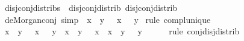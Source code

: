 \begin{isabellebody}
\endisatagproof
{\isafoldproof}%
%
\isadelimproof
\isanewline
%
\endisadelimproof
\isanewline
{}\isamarkupfalse%
\ disj{\isacharunderscore}{\kern0pt}conj{\isacharunderscore}{\kern0pt}distribs\ {\isacharequal}{\kern0pt}\ disj{\isacharunderscore}{\kern0pt}conj{\isacharunderscore}{\kern0pt}distrib\ disj{\isacharunderscore}{\kern0pt}conj{\isacharunderscore}{\kern0pt}distrib{}\isanewline
\isanewline
{}\isamarkupfalse%
%
\isadelimdocument
%
\endisadelimdocument
%
\isatagdocument
%
\isamarkuptrue%
%
\endisatagdocument
{\isafolddocument}%
%
\isadelimdocument
%
\endisadelimdocument
{}\isamarkupfalse%
\ de{\isacharunderscore}{\kern0pt}Morgan{\isacharunderscore}{\kern0pt}conj\ {\isacharbrackleft}{\kern0pt}simp{\isacharbrackright}{\kern0pt}{\isacharcolon}{\kern0pt}\ {\isachardoublequoteopen}\isactrlbold {\isacharminus}{\kern0pt}\ {\isacharparenleft}{\kern0pt}x\ \isactrlbold {\isasymsqinter}\ y{\isacharparenright}{\kern0pt}\ {\isacharequal}{\kern0pt}\ \isactrlbold {\isacharminus}{\kern0pt}\ x\ \isactrlbold {\isasymsqunion}\ \isactrlbold {\isacharminus}{\kern0pt}\ y{\isachardoublequoteclose}\isanewline
%
\isadelimproof
%
\endisadelimproof
%
\isatagproof
{}\isamarkupfalse%
\ {\isacharparenleft}{\kern0pt}rule\ compl{\isacharunderscore}{\kern0pt}unique{\isacharparenright}{\kern0pt}\isanewline
\ \ \isamarkupfalse%
\ {\isachardoublequoteopen}{\isacharparenleft}{\kern0pt}x\ \isactrlbold {\isasymsqinter}\ y{\isacharparenright}{\kern0pt}\ \isactrlbold {\isasymsqinter}\ {\isacharparenleft}{\kern0pt}\isactrlbold {\isacharminus}{\kern0pt}\ x\ \isactrlbold {\isasymsqunion}\ \isactrlbold {\isacharminus}{\kern0pt}\ y{\isacharparenright}{\kern0pt}\ {\isacharequal}{\kern0pt}\ {\isacharparenleft}{\kern0pt}{\isacharparenleft}{\kern0pt}x\ \isactrlbold {\isasymsqinter}\ y{\isacharparenright}{\kern0pt}\ \isactrlbold {\isasymsqinter}\ \isactrlbold {\isacharminus}{\kern0pt}\ x{\isacharparenright}{\kern0pt}\ \isactrlbold {\isasymsqunion}\ {\isacharparenleft}{\kern0pt}{\isacharparenleft}{\kern0pt}x\ \isactrlbold {\isasymsqinter}\ y{\isacharparenright}{\kern0pt}\ \isactrlbold {\isasymsqinter}\ \isactrlbold {\isacharminus}{\kern0pt}\ y{\isacharparenright}{\kern0pt}{\isachardoublequoteclose}\isanewline
\ \ \ \ \isamarkupfalse%
\ {\isacharparenleft}{\kern0pt}rule\ conj{\isacharunderscore}{\kern0pt}disj{\isacharunderscore}{\kern0pt}distrib{\isacharparenright}{\kern0pt}\isanewline
\ \ \isamarkupfalse%
\ \isamarkupfalse%

\end{isabellebody}
